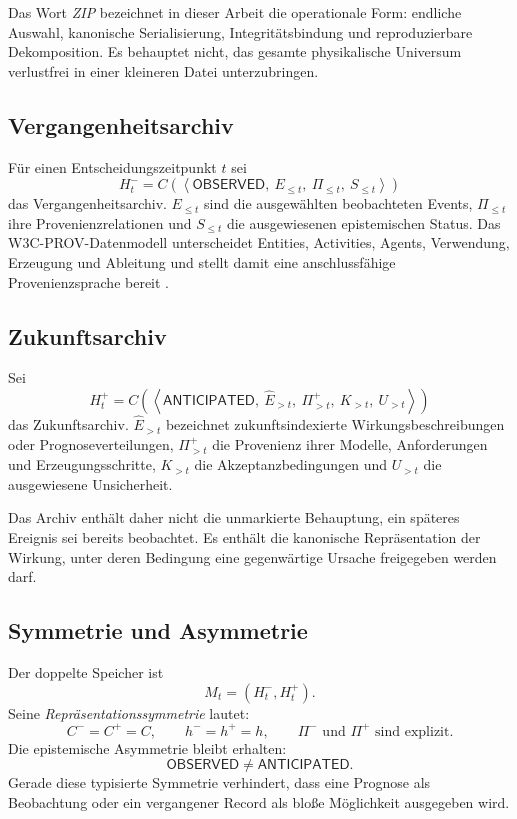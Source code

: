 \documentclass[11pt,a4paper]{article}
\theoremstyle{remark}
\begin{document}
Das Wort \emph{ZIP} bezeichnet in dieser Arbeit die operationale Form:
endliche Auswahl, kanonische Serialisierung, Integritätsbindung und
reproduzierbare Dekomposition. Es behauptet nicht, das gesamte physikalische
Universum verlustfrei in einer kleineren Datei unterzubringen.

\subsection{Vergangenheitsarchiv}

Für einen Entscheidungszeitpunkt \(t\) sei
\[
  H_t^- =
  C\!\left(
    \left\langle
      \textsf{OBSERVED},\
      E_{\leq t},\
      \Pi_{\leq t},\
      S_{\leq t}
    \right\rangle
  \right)
\]
das Vergangenheitsarchiv. \(E_{\leq t}\) sind die ausgewählten beobachteten
Events, \(\Pi_{\leq t}\) ihre Provenienzrelationen und \(S_{\leq t}\) die
ausgewiesenen epistemischen Status. Das W3C-PROV-Datenmodell unterscheidet
Entities, Activities, Agents, Verwendung, Erzeugung und Ableitung und stellt
damit eine anschlussfähige Provenienzsprache bereit \cite{prov}.

\subsection{Zukunftsarchiv}

Sei
\[
  H_t^+ =
  C\!\left(
    \left\langle
      \textsf{ANTICIPATED},\
      \widehat E_{>t},\
      \Pi^+_{>t},\
      K_{>t},\
      U_{>t}
    \right\rangle
  \right)
\]
das Zukunftsarchiv. \(\widehat E_{>t}\) bezeichnet zukunftsindexierte
Wirkungsbeschreibungen oder Prognoseverteilungen, \(\Pi^+_{>t}\) die
Provenienz ihrer Modelle, Anforderungen und Erzeugungsschritte, \(K_{>t}\)
die Akzeptanzbedingungen und \(U_{>t}\) die ausgewiesene Unsicherheit.

Das Archiv enthält daher nicht die unmarkierte Behauptung, ein späteres
Ereignis sei bereits beobachtet. Es enthält die kanonische Repräsentation der
Wirkung, unter deren Bedingung eine gegenwärtige Ursache freigegeben werden
darf.

\subsection{Symmetrie und Asymmetrie}

Der doppelte Speicher ist
\[
  M_t = \left(H_t^-,H_t^+\right).
\]
Seine \emph{Repräsentationssymmetrie} lautet:
\[
  C^- = C^+ = C,
  \qquad
  h^- = h^+ = h,
  \qquad
  \Pi^-\text{ und }\Pi^+\text{ sind explizit}.
\]
Die epistemische Asymmetrie bleibt erhalten:
\[
  \textsf{OBSERVED}\neq\textsf{ANTICIPATED}.
\]
Gerade diese typisierte Symmetrie verhindert, dass eine Prognose als
Beobachtung oder ein vergangener Record als bloße Möglichkeit ausgegeben
wird.
\end{document}
